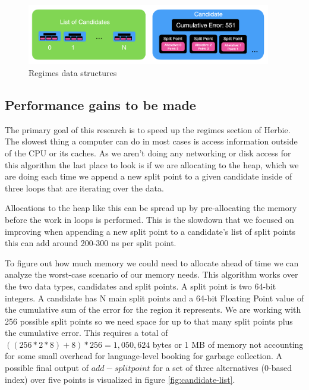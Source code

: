 \documentclass{article}
\begin{document}
\begin{figure}[htbp]
\begin{center}
\includegraphics[width=0.95\textwidth]{candidates.png}
\caption{Regimes data structures}
\label{fig:candidates}
\end{center}
\end{figure}

\subsection{Performance gains to be made}
The primary goal of this research is to speed up the regimes section of Herbie. The slowest thing a computer can do in most cases is access information outside of the CPU or its caches. As we aren't doing any networking or disk access for this algorithm the last place to look is if we are allocating to the heap, which we are doing each time we append a new split point to a given candidate inside of three loops that are iterating over the data. 

Allocations to the heap like this can be spread up by pre-allocating the memory before the work in loops is performed. This is the slowdown that we focused on improving when appending a new split point to a candidate's list of split points this can add around 200-300 ns per split point.

To figure out how much memory we could need to allocate ahead of time we can analyze the worst-case scenario of our memory needs. This algorithm works over the two data types, candidates and split points. A split point is two 64-bit integers. A candidate has N main split points and a 64-bit Floating Point value of the cumulative sum of the error for the region it represents. We are working with 256 possible split points so we need space for up to that many split points plus the cumulative error. This requires a total of  $((256 * 2 *8) + 8) * 256 = 1,050,624$ bytes or 1 MB of memory not accounting for some small overhead for language-level booking for garbage collection. A possible final output of  $add-splitpoint$ for a set of three alternatives (0-based index) over five points is visualized in figure \ref{fig:candidate-list}.
\end{document}
